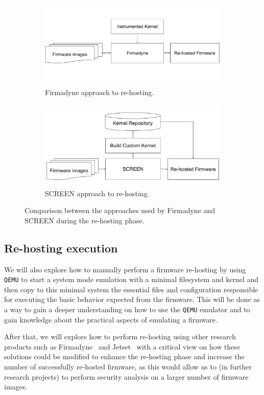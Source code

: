 \begin{figure}[h]
     \centering
     \begin{subfigure}[b]{0.45\textwidth}
         \centering
         \includegraphics[width=\textwidth]{figs/Firmadyne-Approach.pdf}
         \caption{Firmadyne approach to re-hosting.}
         \label{fig:firmadyne-approach}
     \end{subfigure}
     \hfill
     \begin{subfigure}[b]{0.45\textwidth}
         \centering
         \includegraphics[width=\textwidth]{figs/SCREEN-Approach.pdf}
         \caption{SCREEN approach to re-hosting.}
         \label{fig:screen-approach}
     \end{subfigure}
        \caption{Comparison between the approaches used by Firmadyne and SCREEN during the re-hosting phase.}
        \label{fig:firmadyne-screen-compare}
\end{figure}

\subsection{Re-hosting execution}

We will also explore how to manually perform a firmware re-hosting by using {\tt QEMU} to start a system mode emulation with a minimal filesystem and kernel and then copy to this minimal system the essential files and configuration responsible for executing the basic behavior expected from the firmware. This will be done as a way to gain a deeper understanding on how to use the {\tt QEMU} emulator and to gain knowledge about the practical aspects of emulating a firmware.

After that, we will explore how to perform re-hosting using other research products such as Firmadyne~\cite{firmadyne} and Jetset~\cite{jetset} with a critical view on how these solutions could be modified to enhance the re-hosting phase and increase the number of successfully re-hosted firmware, as this would allow us to (in further research projects) to perform security analysis on a larger number of firmware images.